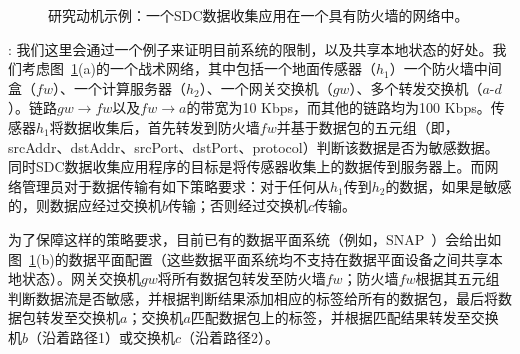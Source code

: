 \begin{figure}[!htbp]
\caption{研究动机示例：一个SDC数据收集应用在一个具有防火墙的网络中。}
\label{fig:fw-example}
\end{figure}

: 
我们这里会通过一个例子来证明目前系统的限制，以及共享本地状态的好处。我们考虑图~\ref{fig:fw-example}(a)的一个战术网络，其中包括一个地面传感器（$h_1$）一个防火墙中间盒（$fw$）、一个计算服务器（$h_2$）、一个网关交换机（$gw$）、多个转发交换机（$a$-$d$）。链路$gw\rightarrow fw$以及$fw \rightarrow a$的带宽为10 Kbps，而其他的链路均为100 Kbps。传感器$h_1$将数据收集后，首先转发到防火墙$fw$并基于数据包的五元组（即，srcAddr、dstAddr、srcPort、dstPort、protocol）判断该数据是否为敏感数据。同时SDC数据收集应用程序的目标是将传感器收集上的数据传到服务器上。而网络管理员对于数据传输有如下策略要求：对于任何从$h_1$传到$h_2$的数据，如果是敏感的，则数据应经过交换机$b$传输；否则经过交换机$c$传输。


为了保障这样的策略要求，目前已有的数据平面系统（例如，SNAP~\cite{arashloo2016snap}）会给出如图~\ref{fig:fw-example}(b)的数据平面配置（这些数据平面系统均不支持在数据平面设备之间共享本地状态）。网关交换机$gw$将所有数据包转发至防火墙$fw$；防火墙$fw$根据其五元组判断数据流是否敏感，并根据判断结果添加相应的标签给所有的数据包，最后将数据包转发至交换机$a$；交换机$a$匹配数据包上的标签，并根据匹配结果转发至交换机$b$（沿着路径1）或交换机$c$（沿着路径2）。


